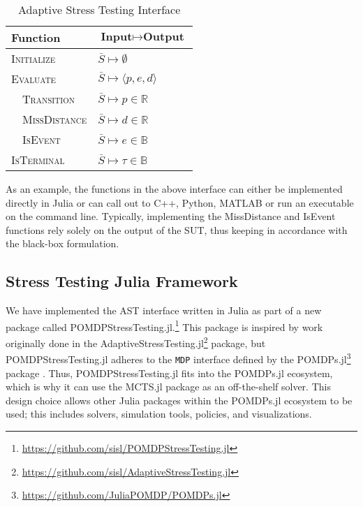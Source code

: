 \begin{table}[!h]
  \centering
  \caption{\label{tab:interface} Adaptive Stress Testing Interface}
  \begin{threeparttable}
  \begin{tabular}{@{}p{6cm}l@{}} %
    \toprule
    \textbf{Function} & \textbf{$\bm{\text{Input}\mapsto\text{Output}}$} \\
    \midrule
    \textsc{Initialize} & $\bar{S} \mapsto \emptyset$ \\
    \textsc{Evaluate} & $\bar{S} \mapsto \langle p, e, d \rangle$ \\
    $\quad$\textsc{Transition} & $\bar{S} \mapsto p \in \mathbb{R}$ \\
    $\quad$\textsc{MissDistance} & $\bar{S} \mapsto d \in \mathbb{R}$ \\
    $\quad$\textsc{IsEvent} & $\bar{S} \mapsto e \in \mathbb{B}$ \\
    \textsc{IsTerminal} & $\bar{S} \mapsto \tau \in \mathbb{B}$ \\
    \bottomrule
  \end{tabular}
  \end{threeparttable}
\end{table}


As an example, the functions in the above interface can either be implemented directly in Julia or can call out to C++, Python, MATLAB\textsuperscript{\textregistered} or run an executable on the command line. Typically, implementing the {\sc MissDistance} and {\sc IsEvent} functions rely solely on the output of the SUT, thus keeping in accordance with the black-box formulation.


\subsection{Stress Testing Julia Framework}
We have implemented the AST interface written in Julia as part of a new package called POMDPStressTesting.jl.\footnote{\url{https://github.com/sisl/POMDPStressTesting.jl}}
This package is inspired by work originally done in the AdaptiveStressTesting.jl\footnote{\url{https://github.com/sisl/AdaptiveStressTesting.jl}} package, but POMDPStressTesting.jl adheres to the \texttt{MDP} interface defined by the POMDPs.jl\footnote{\url{https://github.com/JuliaPOMDP/POMDPs.jl}} package  \cite{pomdps_jl}.
Thus, POMDPStressTesting.jl fits into the POMDPs.jl ecosystem, which is why it can use the MCTS.jl package as an off-the-shelf solver.
This design choice allows other Julia packages within the POMDPs.jl ecosystem to be used; this includes solvers, simulation tools, policies, and visualizations.


